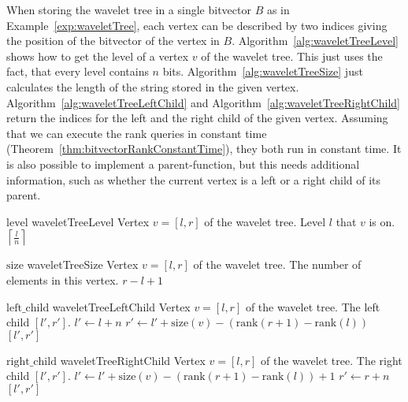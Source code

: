 When storing the wavelet tree in a single bitvector $B$ as in Example~\ref{exp:waveletTree}, each vertex can be described by two indices giving the position of the bitvector of the vertex in $B$. Algorithm~\ref{alg:waveletTreeLevel} shows how to get the level of a vertex $v$ of the wavelet tree. This just uses the fact, that every level contains $n$ bits. Algorithm~\ref{alg:waveletTreeSize} just calculates the length of the string stored in the given vertex. Algorithm~\ref{alg:waveletTreeLeftChild} and Algorithm~\ref{alg:waveletTreeRightChild} return the indices for the left and the right child of the given vertex. Assuming that we can execute the rank queries in constant time (Theorem~\ref{thm:bitvectorRankConstantTime}), they both run in constant time. It is also possible to implement a $\mathrm{parent}$-function, but this needs additional information, such as whether the current vertex is a left or a right child of its parent.

\begin{pseudocode}
  {$\mathrm{level}$}
  {waveletTreeLevel}
  {Vertex $v=[l,r]$ of the wavelet tree.}
  {Level $l$ that $v$ is on.}
  \RETURN $\left\lceil \frac{l}{n} \right\rceil$
\end{pseudocode}

\begin{pseudocode}
  {$\mathrm{size}$}
  {waveletTreeSize}
  {Vertex $v=[l,r]$ of the wavelet tree.}
  {The number of elements in this vertex.}
  \RETURN $r - l + 1$
\end{pseudocode}

\begin{pseudocode}
  {$\mathrm{left\_child}$}
  {waveletTreeLeftChild}
  {Vertex $v=[l,r]$ of the wavelet tree.}
  {The left child $[l',r']$.}
  \STATE $l' \gets l + n$
  \STATE $r' \gets l' + \mathrm{size}(v) - (\mathrm{rank}(r + 1) - \mathrm{rank}(l))$
  \RETURN $[l',r']$
\end{pseudocode}

\begin{pseudocode}
  {$\mathrm{right\_child}$}
  {waveletTreeRightChild}
  {Vertex $v=[l,r]$ of the wavelet tree.}
  {The right child $[l',r']$.}
  \STATE $l' \gets l' + \mathrm{size}(v) - (\mathrm{rank}(r + 1) - \mathrm{rank}(l)) + 1$
  \STATE $r' \gets r + n$
  \RETURN $[l',r']$
\end{pseudocode}


